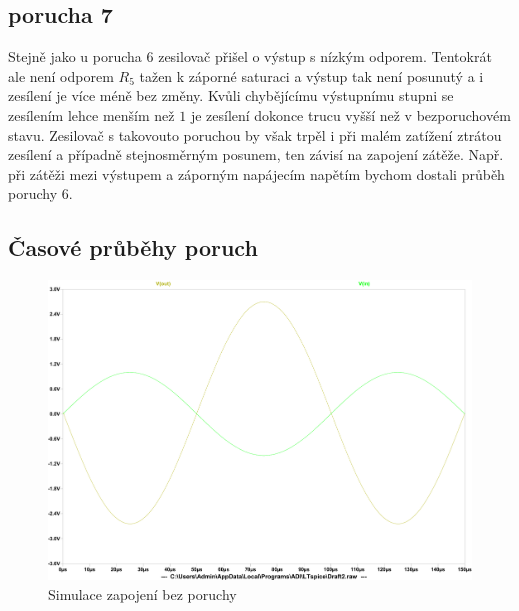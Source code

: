 \documentclass{article}
\begin{document}
\subsection*{porucha 7}

Stejně jako u porucha 6 zesilovač přišel o výstup s nízkým odporem.
Tentokrát ale není odporem \(R_5\) tažen k záporné saturaci a výstup tak není posunutý a i zesílení je více méně bez změny.
Kvůli chybějícímu výstupnímu stupni se zesílením lehce menším než \(1\) je zesílení dokonce trucu vyšší než v bezporuchovém stavu.
Zesilovač s takovouto poruchou by však trpěl i při malém zatížení ztrátou zesílení a případně stejnosměrným posunem, ten závisí na zapojení zátěže.
Např. při zátěži mezi výstupem a záporným napájecím napětím bychom dostali průběh poruchy 6.

\subsection*{Časové průběhy poruch}

\begin{figure}[H]
  \centering
  \includegraphics[width=\textwidth]{sim/bezporuch/tran.pdf}
  \caption{Simulace zapojení bez poruchy}
  \label{tran-bezPoruch}
\end{figure}

\end{document}
